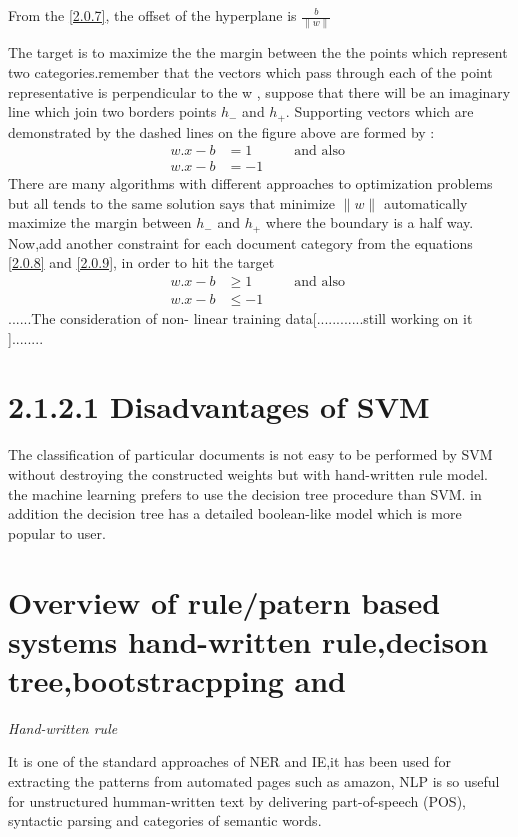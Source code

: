  

From the \eqref{2.0.7}, the offset of the hyperplane is $ \frac{b}{\parallel  w \parallel} $

The target is to maximize the the margin between the the points which represent two categories.remember that the vectors which pass through each of the point representative is perpendicular to the w , suppose that there will be an imaginary line which join two borders points $ h_{-}$ and $ h_{+}$.
Supporting vectors which are demonstrated by the dashed lines on the figure above  are formed by :
\begin{align}
w.x- b & = 1 \label{2.0.8} \quad \quad \quad  \text{and also } \\
w.x- b & = -1 \label{2.0.9}
\end{align}
There are many algorithms with different approaches to optimization problems but all tends to the same solution says that minimize $\parallel w \parallel$ automatically maximize the margin between $ h_{-}$ and $ h_{+}$ where the boundary is a half way. 
Now,add another constraint for each document category from the equations \eqref{2.0.8} and \eqref{2.0.9}, in order to hit the target 
\begin{align}
w.x- b & \geq     1 \label{2.0.8} \quad \quad \quad  \text{and also } \\
w.x- b & \leq -1 \label{2.0.9}
\end{align}
......The consideration of non- linear training data[............still working on it ]........ 

\section*{2.1.2.1 Disadvantages of SVM} 

The classification of particular documents is not easy to be performed by SVM without destroying the constructed weights  but with hand-written rule model. the machine learning prefers to use the decision tree procedure than SVM. in addition the decision tree has a detailed boolean-like  model which is more popular to user.

\section*{Overview of rule/patern based systems hand-written rule,decison tree,bootstracpping and  }

\textit{Hand-written rule}

It is one of the standard approaches of NER and IE,it has been used for extracting the patterns from automated pages such as amazon, NLP is so useful for unstructured humman-written text by delivering  part-of-speech (POS), syntactic parsing and categories of semantic words.


